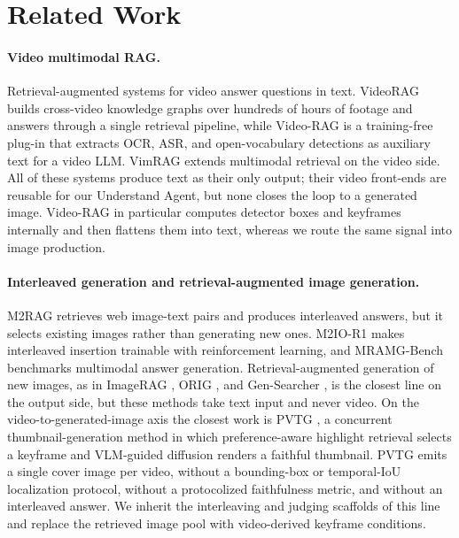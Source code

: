 \section{Related Work}
\label{sec:related}

\paragraph{Video multimodal RAG.}
Retrieval-augmented systems for video answer questions in text. VideoRAG \citep{videorag2502} builds cross-video knowledge graphs over hundreds of hours of footage and answers through a single retrieval pipeline, while Video-RAG \citep{videorag2411} is a training-free plug-in that extracts OCR, ASR, and open-vocabulary detections as auxiliary text for a video LLM. VimRAG \citep{vimrag2602} extends multimodal retrieval on the video side. All of these systems produce text as their only output; their video front-ends are reusable for our Understand Agent, but none closes the loop to a generated image. Video-RAG in particular computes detector boxes and keyframes internally and then flattens them into text, whereas we route the same signal into image production.

\paragraph{Interleaved generation and retrieval-augmented image generation.}
M2RAG \citep{m2rag2411} retrieves web image-text pairs and produces interleaved answers, but it selects existing images rather than generating new ones. M2IO-R1 \citep{m2ior12508} makes interleaved insertion trainable with reinforcement learning, and MRAMG-Bench \citep{mramgbench2502} benchmarks multimodal answer generation. Retrieval-augmented generation of new images, as in ImageRAG \citep{imagerag2502}, ORIG \citep{orig2510}, and Gen-Searcher \citep{gensearcher2603}, is the closest line on the output side, but these methods take text input and never video. On the video-to-generated-image axis the closest work is PVTG \citep{pvtg2607}, a concurrent thumbnail-generation method in which preference-aware highlight retrieval selects a keyframe and VLM-guided diffusion renders a faithful thumbnail. PVTG emits a single cover image per video, without a bounding-box or temporal-IoU localization protocol, without a protocolized faithfulness metric, and without an interleaved answer. We inherit the interleaving and judging scaffolds of this line and replace the retrieved image pool with video-derived keyframe conditions.

